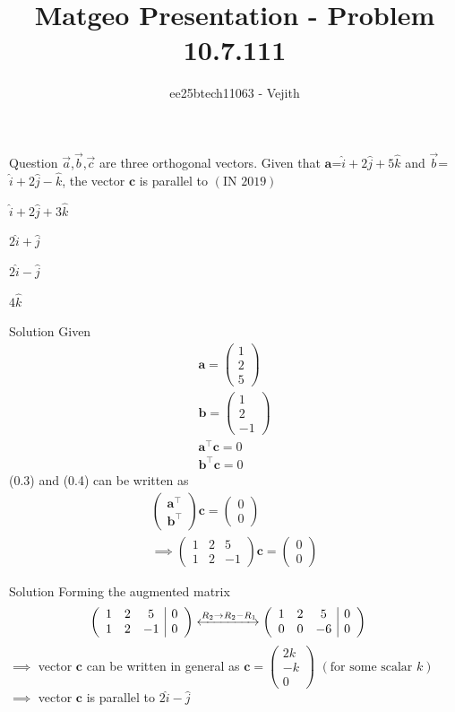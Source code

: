 \documentclass{beamer}
\title{Matgeo Presentation - Problem 10.7.111}
\author{ee25btech11063 - Vejith}
\numberwithin{equation}{section}
\providecommand{\brak}[1]{\ensuremath{\left(#1\right)}}
\theoremstyle{remark}
\newcommand{\myvec}[1]{\ensuremath{\begin{pmatrix}#1\end{pmatrix}}}
\let\vec\mathbf
\begin{document}
\frame{\titlepage}
\begin{frame}{Question}
$\Vec{a}$,$\Vec{b}$,$\Vec{c}$ are three orthogonal vectors. Given that $\vec{a}$=$\hat{i} + 2\hat{j} + 5\hat{k}$ and $\Vec{b}$=$\hat{i} + 2\hat{j} -\hat{k}$, the vector $\vec{c}$ is parallel to \hspace{2.5cm} \brak{\text{IN } 2019}
\begin{enumerate}[label=(\alph*)]
    \begin{multicols}{4}
        \item $\hat{i} + 2\hat{j} + 3\hat{k}$
        \item $2\hat{i} + \hat{j}$
        \item $2\hat{i} - \hat{j}$
        \item $4\hat{k}$
    \end{multicols}
\end{enumerate}
\end{frame}

\begin{frame}{Solution}
Given 
\begin{align}
    \vec{a}=\myvec{1\\2\\5}\\
    \vec{b}=\myvec{1\\2\\-1}\\
    \vec{a}^\top\vec{c}=0\\
    \vec{b}^\top\vec{c}=0
\end{align}
(0.3) and (0.4) can be written as
\begin{align}
    \myvec{\vec{a}^\top \\ \vec{b}^\top}\vec{c}=\myvec{0\\0}\\
    \implies \begin{pmatrix}
        1 & 2 & 5\\
        1 & 2 & -1
    \end{pmatrix}\vec{c}=\myvec{0\\0}
\end{align}
\end{frame}

\begin{frame}{Solution}
Forming the augmented matrix
\begin{align}
    \left(\begin{array}{ccc|c}
        1 & 2 & 5 & 0 \\
        1 & 2 & -1 & 0 
\end{array}\right) &\xleftrightarrow{R_2 \rightarrow R_2- R_1} \left(\begin{array}{ccc|c}
        1 & 2 & 5 & 0 \\
        0 & 0 & -6 & 0 
\end{array}\right)
\end{align}
$\implies$ vector $\vec{c}$ can be written in general as $\vec{c}=\myvec{2k\\-k\\0}$ \brak{\text{for some scalar }k}\\
$\implies$ vector $\vec{c}$ is parallel to $2\hat{i} - \hat{j}$
    \end{frame}
\end{document}
